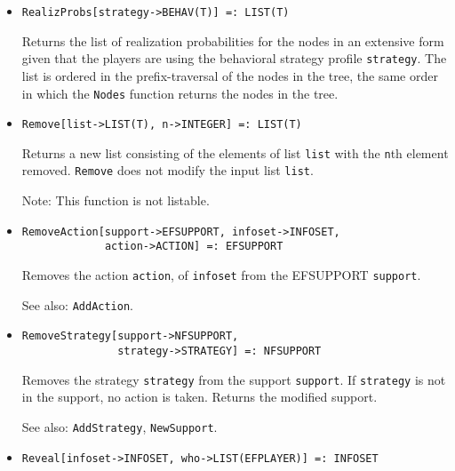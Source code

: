 \begin{itemize}
\item
\protect \large \begin{verbatim}
RealizProbs[strategy->BEHAV(T)] =: LIST(T)
\end{verbatim}\normalsize

\bd
Returns the list of realization probabilities for the
nodes in an extensive form given that the players are using the behavioral
strategy profile \verb+strategy+.  The list is ordered in the prefix-traversal
of the nodes in the tree, the same order in which the {\tt Nodes} function
returns the nodes in the tree.
\ed

\item
\protect \large \begin{verbatim}
Remove[list->LIST(T), n->INTEGER] =: LIST(T)
\end{verbatim}\normalsize

\bd
Returns a new list consisting of the elements of list
\verb+list+ with the \verb+n+th element removed.  {\tt Remove} does not
modify the input list \verb+list+.
\item
[Note:] This function is not listable.
\ed

\item
\protect \large \begin{verbatim}
RemoveAction[support->EFSUPPORT, infoset->INFOSET, 
             action->ACTION] =: EFSUPPORT
\end{verbatim}\normalsize

\bd
Removes the action \verb+action+, of \verb+infoset+  from the 
EFSUPPORT \verb+support+.
\item
[See also:] {\tt AddAction}.
\ed

\item
\protect \large \begin{verbatim}
RemoveStrategy[support->NFSUPPORT, 
               strategy->STRATEGY] =: NFSUPPORT
\end{verbatim}\normalsize

\bd
Removes the strategy \verb+strategy+ from the
support \verb+support+.  If \verb+strategy+ is not in the support,
no action is taken.  Returns the modified support.
\item
[See also:] {\tt AddStrategy}, {\tt NewSupport}.
\ed

\item
\protect \large \begin{verbatim}
Reveal[infoset->INFOSET, who->LIST(EFPLAYER)] =: INFOSET
\end{verbatim}\normalsize


\end{itemize}
